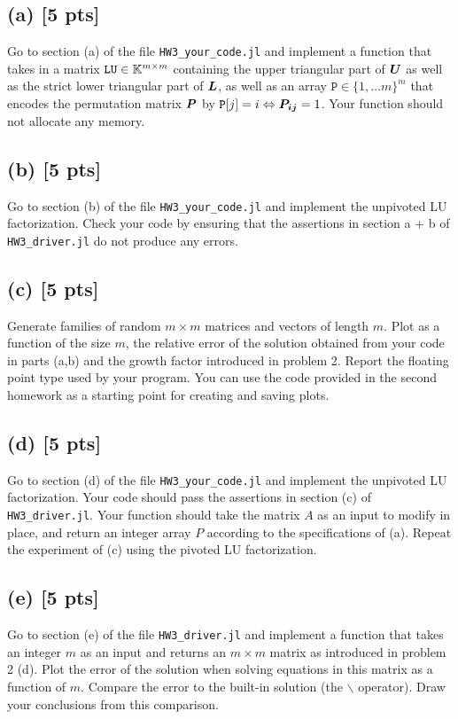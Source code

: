 \documentclass[twoside,10pt]{article}
\begin{document}
\subsection*{(a) [5 pts]} 
Go to section (a) of the file \texttt{HW3\_your\_code.jl} and implement a function that takes in a matrix $\mathtt{LU} \in \mathbb{K}^{m \times m}$ containing the upper triangular part of $\bm{U}$ as well as the strict lower triangular part of $\bm{L}$, as well as an array $\mathtt{P} \in \{1, \ldots m\}^{m}$ that encodes the permutation matrix $\bm{P}$ by $\mathtt{P}[j] = i \Leftrightarrow \bm{P_{ij}} = 1$.
Your function should not allocate any memory. 


\subsection*{(b) [5 pts]} 
Go to section (b) of the file \texttt{HW3\_your\_code.jl} and implement the unpivoted LU factorization. 
Check your code by ensuring that the assertions in section a + b of \texttt{HW3\_driver.jl} do not produce any errors.

\subsection*{(c) [5 pts]}
Generate families of random $m \times m$ matrices and vectors of length $m$. 
Plot as a function of the size $m$, the relative error of the solution obtained from your code in parts (a,b) and the growth factor introduced in problem 2.
Report the floating point type used by your program.
You can use the code provided in the second homework as a starting point for creating and saving plots.

\subsection*{(d) [5 pts]}
Go to section (d) of the file \texttt{HW3\_your\_code.jl} and implement the unpivoted LU factorization. 
Your code should pass the assertions in section (c) of \texttt{HW3\_driver.jl}.
Your function should take the matrix $A$ as an input to modify in place, and return an integer array $P$ according to the specifications of (a).
Repeat the experiment of (c) using the pivoted LU factorization. 


\subsection*{(e) [5 pts]}
Go to section (e) of the file \texttt{HW3\_driver.jl} and implement a function that takes an integer $m$ as an input and returns an $m \times m$ matrix as introduced in problem 2 (d).
Plot the error of the solution when solving equations in this matrix as a function of $m$. 
Compare the error to the built-in solution (the $\backslash$ operator). 
Draw your conclusions from this comparison. 
\end{document}
